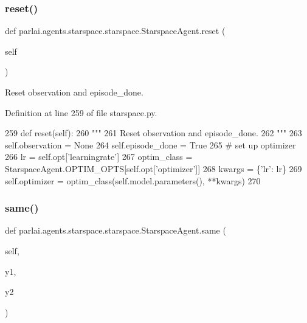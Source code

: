 \subsubsection{\texorpdfstring{reset()}{reset()}}
{\footnotesize\ttfamily def parlai.\+agents.\+starspace.\+starspace.\+Starspace\+Agent.\+reset (\begin{DoxyParamCaption}\item[{}]{self }\end{DoxyParamCaption})}

\begin{DoxyVerb}Reset observation and episode_done.
\end{DoxyVerb}
 

Definition at line 259 of file starspace.\+py.


\begin{DoxyCode}
259     \textcolor{keyword}{def }reset(self):
260         \textcolor{stringliteral}{"""}
261 \textcolor{stringliteral}{        Reset observation and episode\_done.}
262 \textcolor{stringliteral}{        """}
263         self.observation = \textcolor{keywordtype}{None}
264         self.episode\_done = \textcolor{keyword}{True}
265         \textcolor{comment}{# set up optimizer}
266         lr = self.opt[\textcolor{stringliteral}{'learningrate'}]
267         optim\_class = StarspaceAgent.OPTIM\_OPTS[self.opt[\textcolor{stringliteral}{'optimizer'}]]
268         kwargs = \{\textcolor{stringliteral}{'lr'}: lr\}
269         self.optimizer = optim\_class(self.model.parameters(), **kwargs)
270 
\end{DoxyCode}
\mbox{\label{classparlai_1_1agents_1_1starspace_1_1starspace_1_1StarspaceAgent_a763de34b8d6464cbaa1ba17bf83f7df0}} 
\subsubsection{\texorpdfstring{same()}{same()}}
{\footnotesize\ttfamily def parlai.\+agents.\+starspace.\+starspace.\+Starspace\+Agent.\+same (\begin{DoxyParamCaption}\item[{}]{self,  }\item[{}]{y1,  }\item[{}]{y2 }\end{DoxyParamCaption})}



